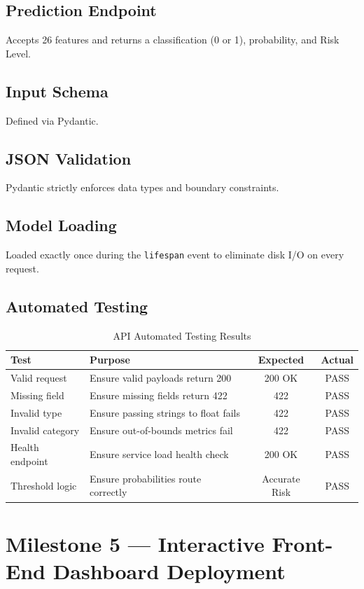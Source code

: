 \documentclass[12pt, a4paper]{article}
\begin{document}
\subsection{Prediction Endpoint}
Accepts 26 features and returns a classification (0 or 1), probability, and Risk Level.

\subsection{Input Schema}
Defined via Pydantic.

\subsection{JSON Validation}
Pydantic strictly enforces data types and boundary constraints.

\subsection{Model Loading}
Loaded exactly once during the \texttt{lifespan} event to eliminate disk I/O on every request.

\subsection{Automated Testing}
\begin{table}[H]
\centering
\begin{tabular}{llcc}
\toprule
\textbf{Test} & \textbf{Purpose} & \textbf{Expected} & \textbf{Actual} \\
\midrule
Valid request & Ensure valid payloads return 200 & 200 OK & PASS \\
Missing field & Ensure missing fields return 422 & 422 & PASS \\
Invalid type & Ensure passing strings to float fails & 422 & PASS \\
Invalid category & Ensure out-of-bounds metrics fail & 422 & PASS \\
Health endpoint & Ensure service load health check & 200 OK & PASS \\
Threshold logic & Ensure probabilities route correctly & Accurate Risk & PASS \\
\bottomrule
\end{tabular}
\caption{API Automated Testing Results}
\end{table}

\section{Milestone 5 — Interactive Front-End Dashboard Deployment}
\end{document}

